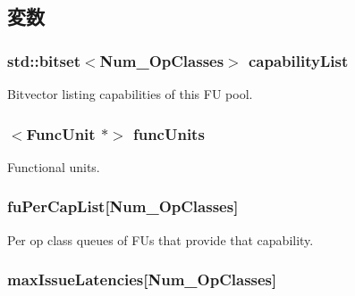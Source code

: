 \subsection{変数}
\hypertarget{classFUPool_a7539c2a37351472e37845fdde96e3d37}{
\subsubsection[{capabilityList}]{\setlength{\rightskip}{0pt plus 5cm}std::bitset$<${\bf Num\_\-OpClasses}$>$ {\bf capabilityList}}}
\label{classFUPool_a7539c2a37351472e37845fdde96e3d37}
Bitvector listing capabilities of this FU pool. \hypertarget{classFUPool_a65261caecadb9b5cbf48625e3c64330d}{
\subsubsection[{funcUnits}]{$<${\bf FuncUnit} $\ast$$>$ {\bf funcUnits}}}
\label{classFUPool_a65261caecadb9b5cbf48625e3c64330d}
Functional units. \hypertarget{classFUPool_a50bef5b8a540cb33884057b9771c4c44}{
\subsubsection[{fuPerCapList}]{ {\bf fuPerCapList}\mbox{[}{\bf Num\_\-OpClasses}\mbox{]}}}
\label{classFUPool_a50bef5b8a540cb33884057b9771c4c44}
Per op class queues of FUs that provide that capability. \hypertarget{classFUPool_ae3464c4dc458673d68839affdb919eeb}{
\subsubsection[{maxIssueLatencies}]{ {\bf maxIssueLatencies}\mbox{[}{\bf Num\_\-OpClasses}\mbox{]}}}
